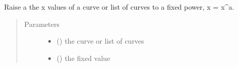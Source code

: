 \documentclass[letterpaper,10pt,english]{sphinxmanual}
\begin{document}

\begin{fulllineitems}
\label{\detokenize{pydv:pydvpy.powrx}}
Raise a the x values of a curve or list of curves to a fixed power, x = x\textasciicircum{}a.

\begin{sphinxVerbatim}[commandchars=\\\{\}]
  
\end{sphinxVerbatim}

\begin{sphinxVerbatim}[commandchars=\\\{\}]
  
\end{sphinxVerbatim}

\begin{sphinxVerbatim}[commandchars=\\\{\}]
\PYG{p}{[}\PYG{p}{]} 
\end{sphinxVerbatim}
\begin{quote}\begin{description}
\item[{Parameters}] \leavevmode\begin{itemize}
\item {} 
 () \textendash{} the curve or list of curves

\item {} 
 () \textendash{} the fixed value

\end{itemize}

\end{description}\end{quote}

\end{fulllineitems}
\end{document}
